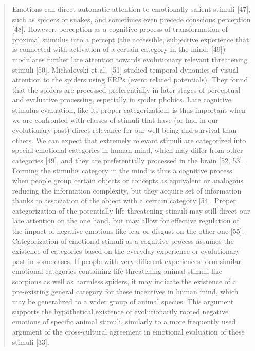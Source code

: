 \documentclass[
]{book}
\begin{document}
\begin{quote}
Emotions can direct automatic attention to emotionally salient stimuli {[}47{]}, such as spiders or snakes, and sometimes even precede conscious perception {[}48{]}. However, perception as a cognitive process of transformation of proximal stimulus into a percept (the accessible, subjective experience that is connected with activation of a certain category in the mind; {[}49{]}) modulates further late attention towards evolutionary relevant threatening stimuli {[}50{]}. Michalovski et al.~{[}51{]} studied temporal dynamics of visual attention to the spiders using ERPs (event related potentials). They found that the spiders are processed preferentially in later stages of perceptual and evaluative processing, especially in spider phobics. Late cognitive stimulus evaluation, like its proper categorization, is thus important when we are confronted with classes of stimuli that have (or had in our evolutionary past) direct relevance for our well-being and survival than others. We can expect that extremely relevant stimuli are categorized into special emotional categories in human mind, which may differ from other categories {[}49{]}, and they are preferentially processed in the brain {[}52, 53{]}. Forming the stimulus category in the mind is thus a cognitive process when people group certain objects or concepts as equivalent or analogous reducing the information complexity, but they acquire set of information thanks to association of the object with a certain category {[}54{]}. Proper categorization of the potentially life-threatening stimuli may still direct our late attention on the one hand, but may allow for effective regulation of the impact of negative emotions like fear or disgust on the other one {[}55{]}. Categorization of emotional stimuli as a cognitive process assumes the existence of categories based on the everyday experience or evolutionary past in some cases. If people with very different experiences form similar emotional categories containing life-threatening animal stimuli like scorpions as well as harmless spiders, it may indicate the existence of a pre-existing general category for these incentives in human mind, which may be generalized to a wider group of animal species. This argument supports the hypothetical existence of evolutionarily rooted negative emotions of specific animal stimuli, similarly to a more frequently used argument of the cross-cultural agreement in emotional evaluation of these stimuli {[}33{]}.
\end{quote}
\end{document}
